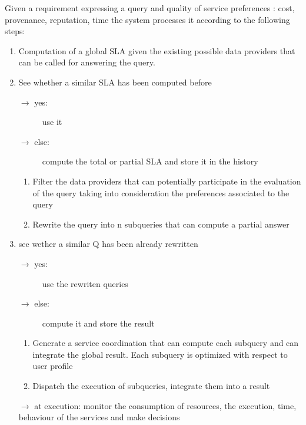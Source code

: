Given a requirement expressing a query and quality of service preferences : cost, provenance, reputation, time the system processes it according to the following steps:

\begin{enumerate}
\item Computation of a global SLA given the existing possible data providers that can be called for answering the query.

\item See whether a similar SLA has been computed before
  \begin{description}
  \item[$\longrightarrow$ yes:] use it
  \item[$\longrightarrow$ else:] compute the total or partial SLA and store it in the history
  \end{description}
  \begin{enumerate}
  \item Filter the data providers that can potentially participate in the evaluation of the query taking into consideration the preferences associated to the query
  \item Rewrite the query into n subqueries that can compute a partial answer
  \end{enumerate}

\item see wether a similar Q has been already rewritten
  \begin{description}
  \item[$\longrightarrow$ yes:] use the rewriten queries
  \item[$\longrightarrow$ else:] compute it and store the result
  \end{description}
  \begin{enumerate}
  \item Generate a service coordination that can compute each subquery and can integrate the global result. 
Each subquery is optimized with respect to user profile
  \item Dispatch the execution of subqueries, integrate them into a result
  \end{enumerate}

\item[$\longrightarrow$] at execution: monitor the consumption of resources, the execution, time, behaviour of the services and make decisions
\end{enumerate}